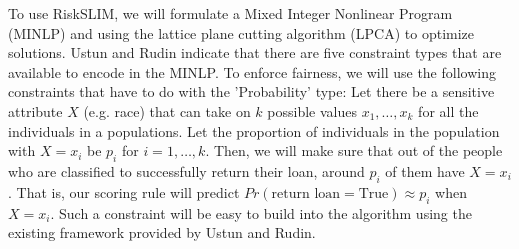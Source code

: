 \documentclass[11pt, margin=1in]{article}
\begin{document}
To use RiskSLIM, we will formulate a Mixed Integer Nonlinear Program (MINLP) and using the lattice plane cutting algorithm (LPCA) to optimize solutions.  Ustun and Rudin indicate that there are five constraint types that are available to encode in the MINLP.  To enforce fairness, we will use the following constraints that have to do with the 'Probability' type: Let there be a sensitive attribute $X$ (e.g. race) that can take on $k$ possible values $x_1, \ldots, x_k$ for all the individuals in a populations.  Let the proportion of individuals in the population with $X = x_i$ be $p_i$ for $i = 1, \ldots, k$.  Then, we will make sure that out of the people who are classified to successfully return their loan, around $p_i$ of them have $X = x_i$.  That is, our scoring rule will predict $Pr(\text{return loan} = \text{True}) \approx p_i$ when $X = x_i$.  Such a constraint will be easy to build into the algorithm using the existing framework provided by Ustun and Rudin.      
\end{document}
